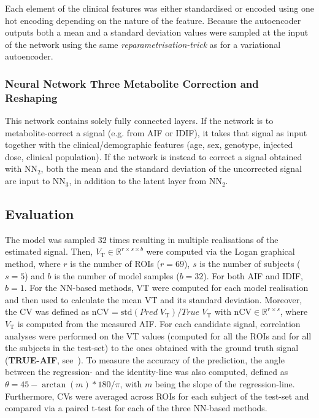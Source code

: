                Each element of the clinical features was either standardised or encoded using one hot encoding depending on the nature of the feature. Because the autoencoder outputs both a mean and a standard deviation values were sampled at the input of the network using the same \textit{reparametrisation-trick} as for a variational autoencoder.
            \subsubsection{Neural Network Three Metabolite Correction and Reshaping} \label{sec:a_bayesian_neural_network-based_method_for_the_extraction_of_a_metabolite_corrected_arterial_input_function_from_dynamic_pbr28_pet_appendix_methods_neural_network_design_neural_network_three_metabolite_correction_and_reshaping}
                This network contains solely fully connected layers. If the network is to metabolite-correct a signal (e.g. from \gls{AIF} or \gls{IDIF}), it takes that signal as input together with the clinical/demographic features (age, sex, genotype, injected dose, clinical population).  If the network is instead to correct a signal obtained with \gls{NN}$_2$, both the mean and the standard deviation of the uncorrected signal are input to \gls{NN}$_3$, in addition to the latent layer from \gls{NN}$_2$.
        
        \subsection{Evaluation} \label{sec:a_bayesian_neural_network-based_method_for_the_extraction_of_a_metabolite_corrected_arterial_input_function_from_dynamic_pbr28_pet_appendix_methods_evaluation}
            The model was sampled $32$ times resulting in multiple realisations of the estimated signal. Then, $V_{\mathrm{T}} \in \mathbb{R}^{r \times s \times b}$ were computed via the Logan graphical method, where $r$ is the number of \glspl{ROI} ($r = 69$), $s$ is the number of subjects ($s = 5$) and $b$ is the number of model samples ($b = 32$). For both \gls{AIF} and \gls{IDIF}, $b=1$. For the \gls{NN}-based methods, \gls{VT} were computed for each model realisation and then used to calculate the mean \gls{VT} and its standard deviation. Moreover, the \gls{CV} was defined as $\mathrm{nCV} = \mathrm{std} (Pred \; V_{\mathrm{T}}) / True \; V_{\mathrm{T}}$ with $\mathrm{nCV} \in \mathbb{R}^{r \times s}$, where $V_{\mathrm{T}}$ is computed from the measured \gls{AIF}. For each candidate signal, correlation analyses were performed on the \gls{VT} values (computed for all the \glspl{ROI} and for all the subjects in the test-set) to the ones obtained with the ground truth signal (\textbf{TRUE-\gls{AIF}}, see~). To measure the accuracy of the prediction, the angle between the regression- and the identity-line was also computed, defined as $\theta = 45 - \arctan(m)*180/\pi$, with $m$ being the slope of the regression-line. Furthermore, \glspl{CV} were averaged across \glspl{ROI} for each subject of the test-set and compared via a paired t-test for each of the three \gls{NN}-based methods.

